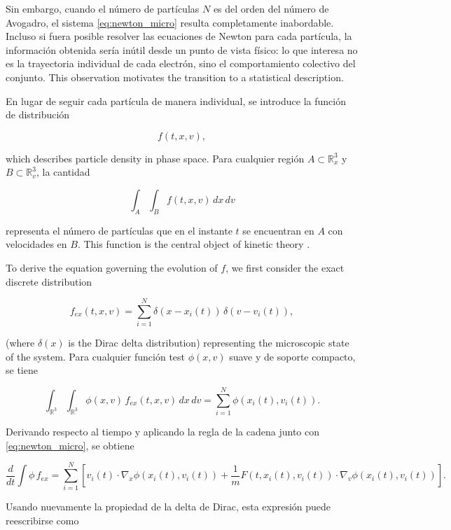 \documentclass[11pt,a4paper,twoside,pdf]{article}
\numberwithin{equation}{section}
\begin{document}
Sin embargo, cuando el número de partículas $N$ es del orden del número de
Avogadro, el sistema \eqref{eq:newton_micro} resulta completamente inabordable.
Incluso si fuera posible resolver las ecuaciones de Newton para cada partícula, la
información obtenida sería inútil desde un punto de vista físico: lo que interesa no
es la trayectoria individual de cada electrón, sino el comportamiento colectivo del
conjunto. This observation motivates the transition to a statistical description.

\medskip

En lugar de seguir cada partícula de manera individual, se introduce la función de
distribución


\[
f(t,x,v),
\]


which describes particle density in phase space. Para cualquier región
$A\subset\mathbb{R}^3_x$ y $B\subset\mathbb{R}^3_v$, la cantidad


\[
\int_A\int_B f(t,x,v)\,dx\,dv
\]


representa el número de partículas que en el instante $t$ se encuentran en $A$ con
velocidades en $B$. This function is the central object of kinetic theory \cite{romeroedp}.

\medskip


To derive the equation governing the evolution of $f$, we first consider the exact discrete distribution

\begin{equation}
f_{ex}(t,x,v)=\sum_{i=1}^N \delta(x-x_i(t))\,\delta(v-v_i(t)),
\label{eq:f_ex}
\end{equation}

(where $\delta(x)$ is the Dirac delta distribution) representing the microscopic state of the system. Para cualquier función test
$\phi(x,v)$ suave y de soporte compacto, se tiene


\[
\int_{\mathbb{R}^3}\int_{\mathbb{R}^3} \phi(x,v)\,f_{ex}(t,x,v)\,dx\,dv
= \sum_{i=1}^N \phi(x_i(t),v_i(t)).
\]



Derivando respecto al tiempo y aplicando la regla de la cadena junto con
\eqref{eq:newton_micro}, se obtiene


\[
\frac{d}{dt}\int \phi\,f_{ex}
= \sum_{i=1}^N \left[
v_i(t)\cdot\nabla_x\phi(x_i(t),v_i(t))
+ \frac{1}{m}F(t,x_i(t),v_i(t))\cdot\nabla_v\phi(x_i(t),v_i(t))
\right].
\]



Usando nuevamente la propiedad de la delta de Dirac, esta expresión puede
reescribirse como
\end{document}
